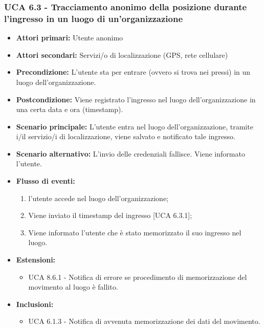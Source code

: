 \subsubsection{UCA 6.3 - Tracciamento anonimo della posizione durante l'ingresso in un luogo di un'organizzazione}
\begin{itemize}
	\item \textbf{Attori primari:} Utente anonimo
	\item \textbf{Attori secondari:} Servizi/o di localizzazione (GPS, rete cellulare)
	\item \textbf{Precondizione:} L'utente sta per entrare (ovvero si trova nei pressi) in un luogo dell'organizzazione.
	\item \textbf{Postcondizione:} Viene registrato l'ingresso nel luogo dell'organizzazione in una certa data e ora (timestamp).
	\item \textbf{Scenario principale:} L'utente entra nel luogo dell'organizzazione, tramite i/il servizio/i di localizzazione, viene salvato e notificato tale ingresso.
	\item \textbf{Scenario alternativo:} L'invio delle credenziali fallisce. Viene informato l'utente.
	\item \textbf{Flusso di eventi:}
	\begin{enumerate}
		\item l'utente accede nel luogo dell'organizzazione;
		\item Viene inviato il timestamp del ingresso [UCA 6.3.1];
		\item Viene informato l'utente che è stato memorizzato il suo ingresso nel luogo.
	\end{enumerate}
	\item \textbf{Estensioni:}
	\begin{itemize}
		\item UCA 8.6.1 - Notifica di errore se procedimento di memorizzazione del movimento al luogo è fallito.
	\end{itemize}
	\item \textbf{Inclusioni:}
	\begin{itemize}
		\item UCA 6.1.3 - Notifica di avvenuta memorizzazione dei dati del movimento.
	\end{itemize}
\end{itemize}

